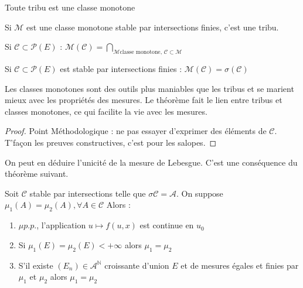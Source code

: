 \documentclass{cours}
\begin{document}
    \begin{remark}
        Toute tribu est une classe monotone
    \end{remark}

    \begin{lemma}
        Si $\mathcal{M}$ est une classe monotone stable par intersections finies, c'est une tribu.
    \end{lemma}
    \begin{definition}
        Si $\mathcal{C} \subset \mathcal{P}(E)$ : $\mathcal{M}(\mathcal{C}) = \bigcap\limits_{\mathcal{M} \text{classe monotone, } \mathcal{C}\subset\mathcal{M}}$
    \end{definition}
    \begin{theorem}
        Si $\mathcal{C} \subset \mathcal{P}(E)$ est stable par intersections finies : $\mathcal{M}(\mathcal{C}) = \sigma{\left(\mathcal{C}\right)}$
    \end{theorem}
    \begin{remark}
        Les classes monotones sont des outils plus maniables que les tribus et se marient mieux avec les propriétés des mesures. Le théorème fait le lien entre tribus et classes monotones, ce qui facilite la vie avec les mesures. 
    \end{remark}
    \begin{proof}
        Point Méthodologique : ne pas essayer d'exprimer des éléments de $\mathcal{C}$. T'façon les preuves constructives, c'est pour les salopes. 
    \end{proof}
    \begin{remark}
        On peut en déduire l'unicité de la mesure de Lebesgue. C'est une conséquence du théorème suivant.
    \end{remark} 
    \begin{theorem}
        Soit $\mathcal{C}$ stable par intersections telle que $\sigma{\mathcal{C}} = \mathcal{A}$.
        On suppose $\mu_{1}(A) = \mu_{2}(A), \forall A \in \mathcal{C}$
        Alors : \begin{enumerate}\item $\mu p.p.$, l'application $u \mapsto f(u, x)$ est continue en $u_{0}$
            \item Si $\mu_{1}(E) = \mu_{2}(E) < +\infty$ alors $\mu_{1} = \mu_{2}$
            \item S'il existe $(E_n) \in \mathcal{A}^{\mathbb{N}}$ croissante d'union $E$ et de mesures égales et finies par $\mu_{1}$ et $\mu_{2}$ alors $\mu_{1} = \mu_{2}$
        \end{enumerate}
    \end{theorem}
\end{document}
